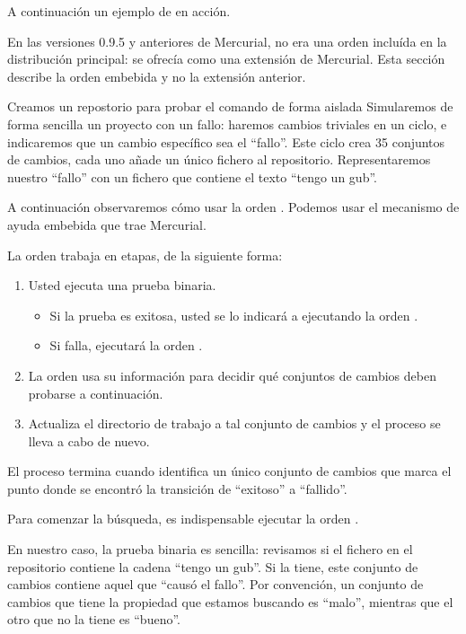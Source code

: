 A continuación un ejemplo de  en acción.

\begin{note}
  En las versiones 0.9.5 y anteriores de Mercurial,  no
  era una orden incluída en la distribución principal: se ofrecía como
  una extensión de Mercurial. Esta sección describe la orden embebida
  y no la extensión anterior.
\end{note}

Creamos un repostorio para probar el comando  de forma
aislada
Simularemos de forma sencilla un proyecto con un fallo: haremos
cambios triviales en un ciclo, e indicaremos que un cambio específico
sea el ``fallo''.  Este ciclo crea 35 conjuntos de cambios, cada uno
añade un único fichero al repositorio. Representaremos nuestro ``fallo''
con un fichero que contiene el texto ``tengo un gub''.

A continuación observaremos cómo usar la orden . Podemos
usar el mecanismo de ayuda embebida que trae Mercurial.

La orden  trabaja en etapas, de la siguiente forma:
\begin{enumerate}
\item Usted ejecuta una prueba binaria.
  \begin{itemize}
  \item Si la prueba es exitosa, usted se lo indicará a 
    ejecutando la orden .
  \item Si falla, ejecutará la orden .
  \end{itemize}
\item La orden usa su información para decidir qué conjuntos de
  cambios deben probarse a continuación.
\item Actualiza el directorio de trabajo a tal conjunto de cambios y
  el proceso se lleva a cabo de nuevo.
\end{enumerate}
El proceso termina cuando  identifica un único conjunto
de cambios que marca el punto donde se encontró la transición de
``exitoso'' a ``fallido''.

Para comenzar la búsqueda, es indispensable ejecutar la orden
.

En nuestro caso, la prueba binaria es sencilla: revisamos si el
fichero en el repositorio contiene la cadena ``tengo un gub''.  Si la
tiene, este conjunto de cambios contiene aquel que ``causó el fallo''.
Por convención, un conjunto de cambios que tiene la propiedad que
estamos buscando es ``malo'', mientras que el otro que no la tiene es
``bueno''.

